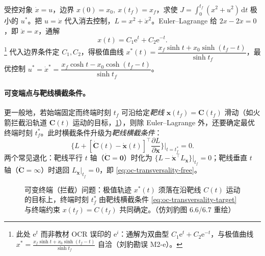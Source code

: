 \begin{example}[二阶系统的最优轨迹]\label{ex:oc-euler-simple}
受控对象 $\dot x=u$，边界 $x(0)=x_0,\ x(t_f)=x_f$，求使 $J=\int_0^{t_f}(x^2+u^2)\,\mathrm dt$ 极小的 $u^*$。把 $u=\dot x$ 代入消去控制，$L=x^2+\dot x^2$。Euler--Lagrange 给 $2x-2\ddot x=0$，即 $\ddot x=x$，通解
\begin{equation}
  x(t)=C_1\mathrm e^{t}+C_2\mathrm e^{-t}.
  \label{eq:oc-euler-sol}
\end{equation}
\footnote{此处 $\mathrm e^{t}$ 而非教材 OCR 误印的 $\mathrm e^{i}$：通解为双曲型 $C_1\mathrm e^{t}+C_2\mathrm e^{-t}$，与极值曲线 $x^*=\frac{x_f\sinh t+x_0\sinh(t_f-t)}{\sinh t_f}$ 自洽（刘豹勘误 M2-e）。}
代入边界条件定 $C_1,C_2$，得极值曲线 $x^*(t)=\dfrac{x_f\sinh t+x_0\sinh(t_f-t)}{\sinh t_f}$，最优控制 $u^*=\dot x^*=\dfrac{x_f\cosh t-x_0\cosh(t_f-t)}{\sinh t_f}$。
\end{example}

\paragraph{可变端点与靶线横截条件。}
更一般地，若始端固定而终端时刻 $t_f$ 可沿给定\emph{靶线} $\mathbf x(t_f)=\mathbf C(t_f)$ 滑动（如火箭拦截沿轨道 $\mathbf C(t)$ 运动的目标，\cref{fig:oc-intercept}），则除 Euler--Lagrange 外，还要确定最优终端时刻 $t_f^*$。此时横截条件升级为\emph{靶线横截条件}\cite{liubao2006modern}：
\begin{equation}
  \Big\{L+[\dot{\mathbf C}(t)-\dot{\mathbf x}(t)]^\top\frac{\partial L}{\partial\dot{\mathbf x}}\Big\}\Big|_{t=t_f^*}=0.
  \label{eq:oc-transversality-target}
\end{equation}
两个常见退化：靶线平行 $t$ 轴（$\dot{\mathbf C}=\mathbf0$）时化为 $\{L-\dot{\mathbf x}^\top L_{\dot{\mathbf x}}\}|_{t_f}=0$；靶线垂直 $t$ 轴（$\dot{\mathbf C}=\infty$）时退回 $L_{\dot{\mathbf x}}|_{t_f}=0$，即 \cref{eq:oc-transversality-free}。

\begin{figure}[ht]
\centering
{}
\caption{可变终端（拦截）问题：极值轨迹 $x^*(t)$ 须落在沿靶线 $C(t)$ 运动的目标上，终端时刻 $t_f^*$ 由靶线横截条件 \cref{eq:oc-transversality-target} 与终端约束 $x(t_f)=C(t_f)$ 共同确定。（仿刘豹图 6.6/6.7 重绘）}
\label{fig:oc-intercept}
\end{figure}

